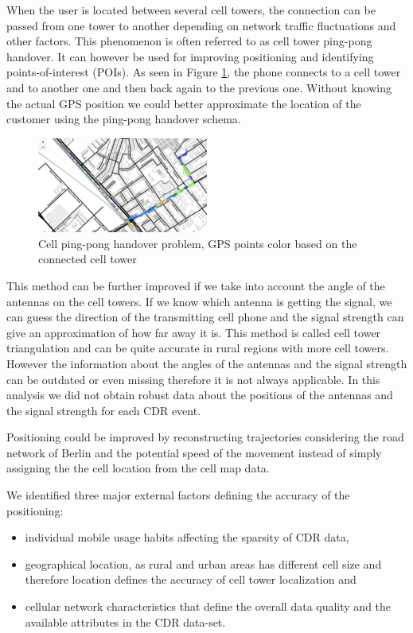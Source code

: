 When the user is located between several cell towers, the connection can be passed from one tower to another depending on network traffic fluctuations and other factors. This phenomenon is often referred to as cell tower ping-pong handover. It can however be used for improving positioning and identifying points-of-interest (POIs). As seen in Figure \ref{fig:ping-pong}, the phone connects to a cell tower and to another one and then back again to the previous one. Without knowing the actual GPS position we could better approximate the location of the customer using the ping-pong handover schema.

\begin{figure}[h]
    \centering
    \includegraphics[width=0.5\textwidth]{images/ping-pong.png}
    \caption{Cell ping-pong handover problem, GPS points color based on the connected cell tower}
    \label{fig:ping-pong}
\end{figure}

This method can be further improved if we take into account the angle of the antennas on the cell towers. If we know which antenna is getting the signal, we can guess the direction of the transmitting cell phone and the signal strength can give an approximation of how far away it is. This method is called cell tower triangulation and can be quite accurate in rural regions with more cell towers. However the information about the angles of the antennas and the signal strength can be outdated or even missing therefore it is not always applicable. In this analysis we did not obtain robust data about the positions of the antennas and the signal strength for each CDR event.

Positioning could be improved by reconstructing trajectories considering the road network of Berlin and the potential speed of the movement instead of simply assigning the the cell location from the cell map data.

We identified three major external factors defining the accuracy of the positioning:
\begin{itemize}
    \item individual mobile usage habits affecting the sparsity of CDR data,
    \item geographical location, as rural and urban areas has different cell size and therefore location defines the accuracy of cell tower localization and
    \item cellular network characteristics that define the overall data quality and the available attributes in the CDR data-set.
\end{itemize}
